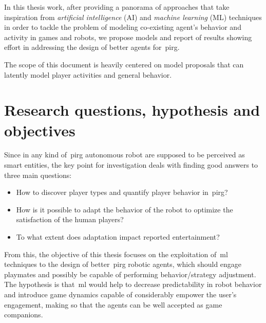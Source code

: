 In this thesis work, after providing a panorama of approaches that take inspiration from \textit{artificial intelligence} (AI) and \textit{machine learning} (ML) techniques in order to tackle the problem of modeling co-existing agent's behavior and activity in games and robots, we propose models and report of results showing effort in addressing the design of better agents for~\gls{pirg}.

The scope of this document is heavily centered on model proposals that can latently model player activities and general behavior. 

\section{Research questions, hypothesis and objectives}\label{sec:research_question}
Since in any kind of~\gls{pirg} autonomous robot are supposed to be perceived as smart entities, the key point for investigation deals with finding good answers to three main questions:

\begin{itemize}
\item How to discover player types and quantify player behavior in~\gls{pirg}?
\item How is it possible to adapt the behavior of the robot to optimize the satisfaction of the human players?
\item To what extent does adaptation impact reported entertainment?
\end{itemize}

From this, the objective of this thesis focuses on the exploitation of~\gls{ml} techniques to the design of better~\gls{pirg} robotic agents, which should engage playmates and possibly be capable of performing behavior/strategy adjustment. The hypothesis is that~\gls{ml} would help to decrease predictability in robot behavior and introduce game dynamics capable of considerably empower the user’s engagement, making so that the agents can be well accepted as game companions.



